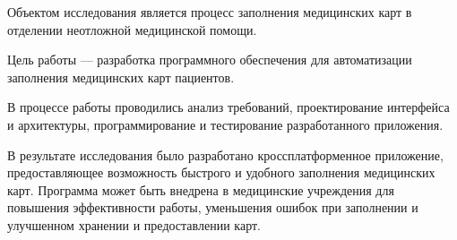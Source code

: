 \abstract %


Объектом исследования является процесс заполнения медицинских карт в отделении неотложной медицинской помощи.

Цель работы — разработка программного обеспечения для автоматизации заполнения медицинских карт пациентов.

В процессе работы проводились анализ требований, проектирование интерфейса и архитектуры, программирование и тестирование разработанного приложения.

В результате исследования было разработано кроссплатформенное приложение, предоставляющее возможность быстрого и удобного заполнения медицинских карт. Программа может быть внедрена в медицинские учреждения для повышения эффективности работы, уменьшения ошибок при заполнении и улучшенном хранении и предоставлении карт.